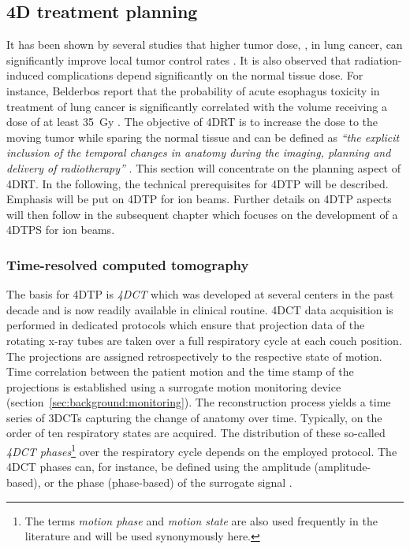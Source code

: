 \subsection{4D treatment planning}
\label{sec:background:4DTP}
It has been shown by several studies that higher tumor dose, \eg, in
lung cancer, can significantly improve local tumor control rates
\citep{Rosenzweig2005,Kong2005}. It is also observed that
radiation-induced complications depend significantly on the normal
tissue dose. For instance, Belderbos \etal report that the probability
of acute esophagus toxicity in treatment of lung cancer is
significantly correlated with the volume receiving a dose of at least
\SI{35}{Gy} \citep{Belderbos2005}. The objective of \ac{4DRT} is to
increase the dose to the moving tumor while sparing the normal tissue
and can be defined as \emph{``the explicit inclusion of the temporal
  changes in anatomy during the imaging, planning and delivery of
  radiotherapy''} \citep{Keall2004}. This section will concentrate on
the planning aspect of \ac{4DRT}. In the following, the technical
prerequisites for \acl{4DTP} will be described. Emphasis will be put
on \ac{4DTP} for ion beams. Further details on \ac{4DTP} aspects will
then follow in the subsequent chapter which focuses on the development
of a \ac{4DTPS} for ion beams.

%
%

\subsubsection{Time-resolved computed tomography}
The basis for \ac{4DTP} is \emph{\ac{4DCT}} which was developed at
several centers in the past decade and is now readily available
\citep{Ford2003,Keall2004,Rietzel2005} in clinical
routine. \ac{4DCT} data acquisition is performed in dedicated
protocols which ensure that projection data of the rotating x-ray
tubes are taken over a full respiratory cycle at each couch
position. The projections are assigned retrospectively to the
respective state of motion. Time correlation between the patient
motion and the time stamp of the projections is established using
a surrogate motion monitoring device
(section~\ref{sec:background:monitoring}). The reconstruction process
yields a time series of \acp{3DCT} capturing the change of anatomy
over time. Typically, on the order of ten respiratory states are
acquired. The distribution of these so-called \emph{\ac{4DCT}
  phases}\footnote{The terms \emph{motion phase} and \emph{motion
    state} are also used frequently in the literature and will be used
  synonymously here.}  over the respiratory cycle depends on the
employed protocol. The \ac{4DCT} phases can, for instance, be defined
using the amplitude (amplitude-based), or the phase (phase-based) of
the surrogate signal \citep{Lu2006b}.

